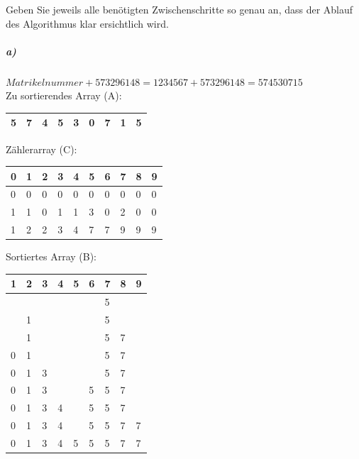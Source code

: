 \documentclass[a4paper, 12pt]{article}
\begin{document}
Geben Sie jeweils alle benötigten Zwischenschritte so genau an, dass der Ablauf des Algorithmus klar ersichtlich wird.

\subparagraph{a)}

$ Matrikelnummer + 573 296 148 = 1 234 567 + 573 296 148 =  574 530 715 $\\

Zu sortierendes Array (A):
\begin{center}
	\newcommand{\columnWidth}{0.5cm}
	\begin{tabular}{|p{\columnWidth}|p{\columnWidth}|p{\columnWidth}
					|p{\columnWidth}|p{\columnWidth}|p{\columnWidth}
					|p{\columnWidth}|p{\columnWidth}|p{\columnWidth}|}
		\hline
		5 & 7 & 4 & 5 & 3 & 0 & 7 & 1 & 5\\
		\hline
	\end{tabular}
\end{center}

Zählerarray (C):

\begin{center}
	\newcommand{\columnWidth}{0.5cm}
	\begin{tabular}{|p{\columnWidth}|p{\columnWidth}|p{\columnWidth}
					|p{\columnWidth}|p{\columnWidth}|p{\columnWidth}
					|p{\columnWidth}|p{\columnWidth}|p{\columnWidth}|
					p{\columnWidth}|}
		\hline
		0 & 1 & 2 & 3 & 4 & 5 & 6 & 7 & 8 & 9\\
		\hline
		\hline
		0 & 0 & 0 & 0 & 0 & 0 & 0 & 0 & 0 & 0\\
		1 & 1 & 0 & 1 & 1 & 3 & 0 & 2 & 0 & 0\\
		1 & 2 & 2 & 3 & 4 & 7 & 7 & 9 & 9 & 9\\
		\hline
	\end{tabular}
\end{center}

Sortiertes Array (B):

\begin{center}
	\newcommand{\columnWidth}{0.5cm}
	\begin{tabular}{|p{\columnWidth}|p{\columnWidth}|p{\columnWidth}
					|p{\columnWidth}|p{\columnWidth}|p{\columnWidth}
					|p{\columnWidth}|p{\columnWidth}|p{\columnWidth}|}
		\hline
		 1 & 2 & 3 & 4 & 5 & 6 & 7 & 8 & 9 \\
		\hline
		   &   &   &   &   &   & 5 &   &   \\
		   & 1 &   &   &   &   & 5 &   &   \\
		   & 1 &   &   &   &   & 5 & 7 &   \\
		 0 & 1 &   &   &   &   & 5 & 7 &   \\
		 0 & 1 & 3 &   &   &   & 5 & 7 &   \\
		 0 & 1 & 3 &   &   & 5 & 5 & 7 &   \\
		 0 & 1 & 3 & 4 &   & 5 & 5 & 7 &   \\
		 0 & 1 & 3 & 4 &   & 5 & 5 & 7 & 7 \\
		 0 & 1 & 3 & 4 & 5 & 5 & 5 & 7 & 7 \\
		\hline
	\end{tabular}
\end{center}



\titleformat{\section}{\sffamily\bfseries}{}{0pt}{}[{\color{aqua}\hrule}]

\printbibliography
\end{document}
